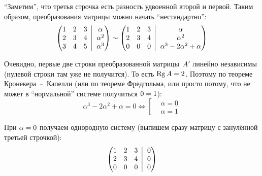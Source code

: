 \documentclass[a4paper,12pt]{article}
\newcommand{\BigMiddleThree}{\;\left|\vphantom{\begin{pmatrix} 0\\0\\0 \end{pmatrix}}\right.\;}
\begin{document}
  \begin{solution}
    ``Заметим'', что третья строчка есть разность удвоенной второй и первой.
    Таким образом, преобразования матрицы можно начать ``нестандартно'':
    \[
      \left(
        \begin{matrix}
          1 & 2 & 3\\
          2 & 3 & 4\\
          3 & 4 & 5
        \end{matrix}
        \BigMiddleThree
        \begin{matrix}
          \alpha\\
          \alpha^2\\
          \alpha^3
        \end{matrix}
      \right)
      \sim \left(
        \begin{matrix}
          1 & 2 & 3\\
          2 & 3 & 4\\
          0 & 0 & 0
        \end{matrix}
        \BigMiddleThree
        \begin{matrix}
          \alpha\\
          \alpha^2\\
          \alpha^3 - 2\alpha^2 + \alpha
        \end{matrix}
      \right)
    \]

    Очевидно, первые две строки преобразованной матрицы~$A'$ линейно независимы (нулевой строки там уже не получится).
    То есть $\Rg A \hm= 2$.
    Поэтому по теореме Кронекера~--~Капелли (или по теореме Фредгольма, или просто потому, что не может в ``нормальной'' системе получиться $0 \hm= 1$):
    \[
      \alpha^3 - 2\alpha^2 + \alpha = 0
      \Leftrightarrow \left[
        \begin{aligned}
          &\alpha = 0\\
          &\alpha = 1
        \end{aligned}
      \right.
    \]

    При $\alpha \hm= 0$ получаем однородную систему (выпишем сразу матрицу с занулённой третьей строчкой):
    \begin{equation}\label{19-19-sys-homo}
      \left(
        \begin{matrix}
          1 & 2 & 3\\
          2 & 3 & 4\\
          0 & 0 & 0
        \end{matrix}
        \BigMiddleThree
        \begin{matrix}
          0\\
          0\\
          0
        \end{matrix}
      \right)
    \end{equation}
    

\end{solution}
\end{document}
